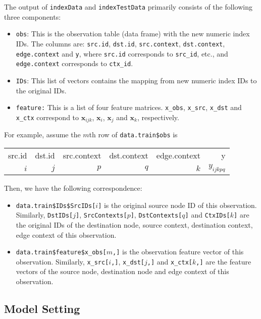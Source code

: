 \documentclass[10pt]{article}
\begin{document}
The output of {\tt indexData} and {\tt indexTestData} primarily consists of the following three components:
\begin{itemize}
\item {\tt obs}: This is the observation table (data frame) with the new numeric index IDs.  The columns are: {\tt src.id}, {\tt dst.id}, {\tt src.context}, {\tt dst.context}, {\tt edge.context} and {\tt y}, where {\tt src.id} corresponds to {\tt src\_id}, etc., and {\tt edge.context} corresponds to {\tt ctx\_id}.
\item {\tt IDs}: This list of vectors contains the mapping from new numeric index IDs to the original IDs.
\item {\tt feature:} This is a list of four feature matrices.  {\tt x\_obs}, {\tt x\_src}, {\tt x\_dst} and {\tt x\_ctx} correspond to $\bm{x}_{ijk}$, $\bm{x}_{i}$, $\bm{x}_{j}$ and $\bm{x}_{k}$, respectively.
\end{itemize}
For example, assume the $m$th row of {\tt data.train\$obs} is \\
{\small\begin{center}\begin{tabular}{r r r r r r}
src.id & dst.id & src.context & dst.context & edge.context & y \\
   $i$ &    $j$ &         $p$ &         $q$ &          $k$ & $y_{ijkpq}$ \\
\end{tabular}\end{center}}
\noindent Then, we have the following correspondence:
\begin{itemize}
\item {\tt data.train\$IDs\$SrcIDs[$i$]} is the original source node ID of this observation.  Similarly, {\tt DstIDs[$j$]}, {\tt SrcContexts[$p$]}, {\tt DstContexts[$q$]} and {\tt CtxIDs[$k$]} are the original IDs of the destination node, source context, destination context, edge context of this observation.
\item {\tt data.train\$feature\$x\_obs[$m$,]} is the observation feature vector of this observation.  Similarly, {\tt x\_src[$i$,]}, {\tt x\_dst[$j$,]} and {\tt x\_ctx[$k$,]} are the feature vectors of the source node, destination node and edge context of this observation.
\end{itemize}

\subsection{Model Setting}
\end{document}
